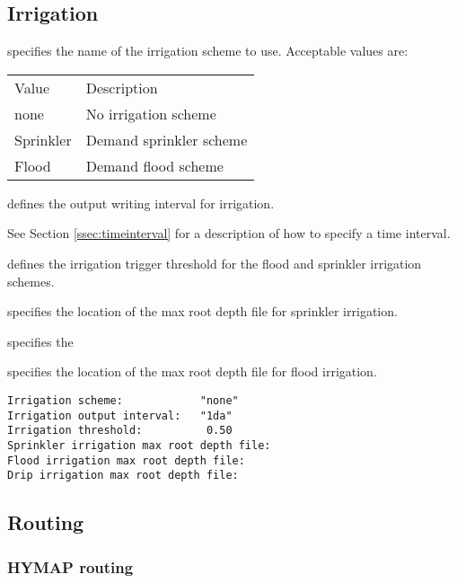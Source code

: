  
 \subsection{Irrigation} \label{ssec:irrigation}
 

 
  specifies the name of the irrigation
 scheme to use.
 Acceptable values are:

 \begin{tabular}{ll}
 Value     & Description             \\
 none      & No irrigation scheme    \\
 Sprinkler & Demand sprinkler scheme \\
 Flood     & Demand flood scheme \\
 \end{tabular}

  defines the output writing
 interval for irrigation.

 See Section \ref{ssec:timeinterval} for a description
 of how to specify a time interval.

  defines the irrigation trigger
 threshold for the flood and sprinkler irrigation schemes.

  specifies the
 location of the max root depth file for sprinkler irrigation.

  specifies the

  specifies the
 location of the max root depth file for flood irrigation.
 

 \begin{Verbatim}[frame=single]
Irrigation scheme:            "none"
Irrigation output interval:   "1da"
Irrigation threshold:          0.50
Sprinkler irrigation max root depth file:
Flood irrigation max root depth file:
Drip irrigation max root depth file:
 \end{Verbatim}	

 
 \subsection{Routing} \label{ssec:routing}
 

 
 \subsubsection{HYMAP routing} \label{sssec:hymaprouting}
 

